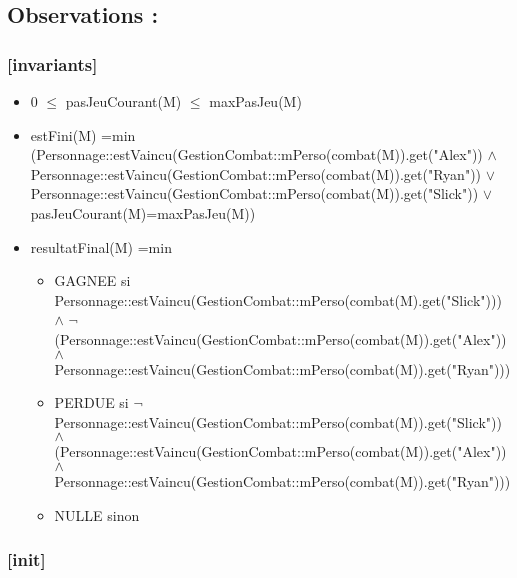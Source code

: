 \documentclass[11pt]{article}
\begin{document}
\subsection{Observations :}
\label{sec-1.7}

\subsubsection{[invariants]}
\label{sec-1.7.1}

\begin{itemize}

\item 0 $\leqslant$ pasJeuCourant(M) $\leqslant$ maxPasJeu(M)\\
\label{sec-1.7.1.1}


\item estFini(M) =min (Personnage::estVaincu(GestionCombat::mPerso(combat(M)).get("Alex")) $\wedge$ Personnage::estVaincu(GestionCombat::mPerso(combat(M)).get("Ryan")) $\vee$ Personnage::estVaincu(GestionCombat::mPerso(combat(M)).get("Slick")) $\vee$ pasJeuCourant(M)=maxPasJeu(M))\\
\label{sec-1.7.1.2}


\item resultatFinal(M) =min\\
\label{sec-1.7.1.3}

\begin{itemize}

\item GAGNEE si Personnage::estVaincu(GestionCombat::mPerso(combat(M).get("Slick"))) $\wedge$ $\neg$(Personnage::estVaincu(GestionCombat::mPerso(combat(M)).get("Alex")) $\wedge$ Personnage::estVaincu(GestionCombat::mPerso(combat(M)).get("Ryan")))\\
\label{sec-1.7.1.3.1}


\item PERDUE si $\neg$Personnage::estVaincu(GestionCombat::mPerso(combat(M)).get("Slick")) $\wedge$ (Personnage::estVaincu(GestionCombat::mPerso(combat(M)).get("Alex")) $\wedge$ Personnage::estVaincu(GestionCombat::mPerso(combat(M)).get("Ryan")))\\
\label{sec-1.7.1.3.2}


\item NULLE sinon\\
\label{sec-1.7.1.3.3}


\end{itemize} %
\end{itemize} %
\subsubsection{[init]}
\label{sec-1.7.2}
\end{document}
